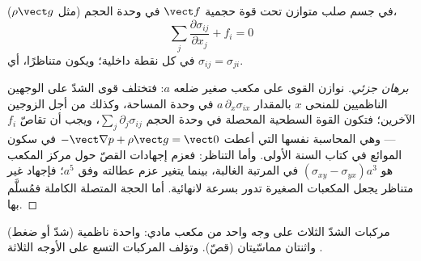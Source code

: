\begin{proposition}\label{prop:b3:continuum-elasticity:equilibrium}
في جسم صلب متوازن تحت قوة حجمية $\vect f$ في وحدة
الحجم (مثل $\rho\vect g$)،
\[
\sum_j\frac{\partial\sigma_{ij}}{\partial x_j} + f_i = 0
\]
في كل نقطة داخلية؛ ويكون  متناظرًا، أي
$\sigma_{ij} = \sigma_{ji}$.
\end{proposition}

\begin{proof}[برهان جزئي]
نوازن القوى على مكعب صغير ضلعه $a$: فتختلف قوى الشدّ على
الوجهين الناظميين للمنحى $x$ بالمقدار $a\,\partial_x\sigma_{ix}$ في
وحدة المساحة، وكذلك من أجل الزوجين الآخرين؛ فتكون القوة السطحية
المحصلة في وحدة الحجم $\sum_j\partial_j\sigma_{ij}$، ويجب أن
تقاصّ $f_i$ --- وهي المحاسبة نفسها التي أعطت
$-\vect\nabla p + \rho\vect g = \vect 0$ في سكون الموائع في كتاب
السنة الأولى. وأما التناظر: فعزم إجهادات القصّ حول مركز المكعب
هو $(\sigma_{xy} -
\sigma_{yx})a^3$ في المرتبة الغالبة، بينما
يتغير عزم عطالته وفق $a^5$؛ فإجهاد غير متناظر يجعل المكعبات
الصغيرة تدور بسرعة لانهائية. أما الحجة المتصلة الكاملة فمُسلَّم
بها.
\end{proof}

\begin{omfigure}

{\small مركبات الشدّ الثلاث على وجه واحد من مكعب مادي: واحدة
ناظمية (شدّ أو ضغط) واثنتان مماسّيتان (قصّ). وتؤلف المركبات
التسع على الأوجه الثلاثة .}
\end{omfigure}

